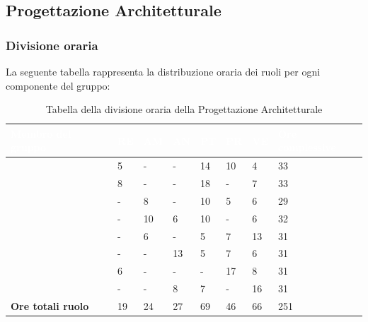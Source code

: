 \subsection{Progettazione Architetturale}

\subsubsection{Divisione oraria}
La seguente tabella rappresenta la distribuzione oraria dei ruoli per ogni componente del gruppo:
{
\renewcommand{\arraystretch}{2}
\begin{longtable}[h!] { C{4cm} C{1cm} C{1cm} C{1cm} C{1cm} C{1cm} C{1cm} C{3cm}}
\caption{Tabella della divisione oraria della Progettazione Architetturale}\\

\textcolor{white}{\textbf{Membro del gruppo}} & 
\textcolor{white}{\textbf{RE}} & 
\textcolor{white}{\textbf{AM}} & 
\textcolor{white}{\textbf{AN}} & 
\textcolor{white}{\textbf{PT}} & 
\textcolor{white}{\textbf{PR}} & 
\textcolor{white}{\textbf{VE}} & 
\textcolor{white}{\textbf{Ore complessive}}\\	
\endhead
        
\MC{}                     &  5 &  - &  - & 14 & 10 &  4 &  33 \\
\LD{}                     &  8 &  - &  - & 18 &  - &  7 &  33 \\
\CE{}                     &  - &  8 &  - & 10 &  5 &  6 &  29 \\
\SE{}                     &  - & 10 &  6 & 10 &  - &  6 &  32 \\
\PF{}                     &  - &  6 &  - &  5 &  7 & 13 &  31 \\
\DF{}                     &  - &  - & 13 &  5 &  7 &  6 &  31 \\
\BR{}                     &  6 &  - &  - &  - & 17 &  8 &  31 \\
\AT{}                     &  - &  - &  8 &  7 &  - & 16 &  31 \\
\textbf{Ore totali ruolo} & 19 & 24 & 27 & 69 & 46 & 66 & 251 \\
		
\end{longtable}
}

